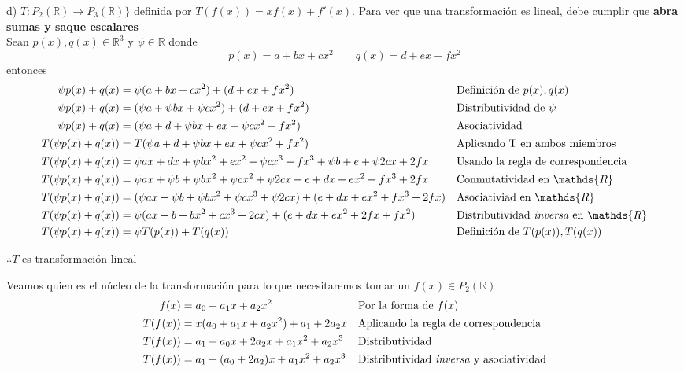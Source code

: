 \documentclass[letterpaper]{article}
\newcommand{\R}{\mathds{R}}
\renewcommand{\*}{\cdot}
\theoremstyle{definition}
\begin{document}
	
	d) $T: P_{2}(\mathbb{R}) \longrightarrow P_{3}(\mathbb{R}) \rbrace$ definida por $T(f(x)) = xf(x) + f'(x)$.
	Para ver que una transformación es lineal, debe cumplir que \textbf{abra sumas y saque escalares}\\
	Sean $ p(x), q(x) \in \R^3 $ y $ \psi \in \R $ donde
	\[ p(x) = a + bx + cx^2 \qquad q(x) = d + ex + fx^2 \]
	entonces 
	\begin{align*}
		\psi p(x) + q(x) &= \psi (a + bx + cx^2) + (d + ex + fx^2) && \text{Definición de $ p(x), q(x) $}\\
		\psi p(x) + q(x) &= (\psi a + \psi bx + \psi cx^2) + (d + ex + fx^2) && \text{Distributividad de $\psi$}\\
		\psi p(x) + q(x) &= (\psi a+d + \psi bx + ex + \psi cx^2 + fx^2)&& \text{Asociatividad}\\
		T(\psi p(x) + q(x)) &= T(\psi a +d + \psi bx + ex + \psi cx^2 + fx^2)&& \text{Aplicando T en ambos miembros}\\
		T(\psi p(x) + q(x)) &= \psi ax + dx + \psi bx^2 + ex^2 + \psi cx^3 + fx^3 + \psi b + e + \psi 2cx + 2fx&& \text{Usando la regla de correspondencia}\\
		T(\psi p(x) + q(x)) &= \psi ax + \psi b + \psi b x^2+ \psi cx^2 + \psi 2cx + e +dx + ex^2  + fx^3 + 2fx&& \text{Conmutatividad en $ \R $}\\
		T(\psi p(x) + q(x)) &= (\psi ax + \psi b + \psi b x^2+ \psi cx^3 + \psi 2cx) + (e +dx + ex^2  + fx^3 + 2fx)&& \text{Asociativiad en $ \R $}\\
		T(\psi p(x) + q(x)) &= \psi(ax + b + bx^2+ cx^3 + 2cx) + (e + dx + ex^2 + 2fx + fx^2 )&& \text{Distributividad \textit{inversa} en $ \R $}\\
		T(\psi p(x) + q(x)) &= \psi T(p(x)) + T(q(x))&& \text{Definición de $ T(p(x)), T(q(x)) $}\\
	\end{align*}
	\begin{center}
		$ \therefore T $ es transformación lineal
	\end{center}
	Veamos quien es el núcleo de la transformación para lo que necesitaremos tomar un $ f(x) \in P_2 (\R) $
	\begin{align*}
		f(x) & = a_0 + a_1 x + a_2 x^2 && \text{Por la forma de $ f(x) $}\\
		T(f(x)) & = x(a_0 + a_1 x + a_2 x^2) + a_1 + 2a_2 x && \text{Aplicando la regla de correspondencia}\\
		T(f(x)) & = a_1 + a_0x + 2a_2 x + a_1 x^2 + a_2 x^3  && \text{Distributividad}\\
		T(f(x)) & = a_1 + (a_0 + 2a_2)x  + a_1 x^2 + a_2 x^3  && \text{Distributividad \textit{inversa} y asociatividad}\\
	\end{align*}
\end{document}
